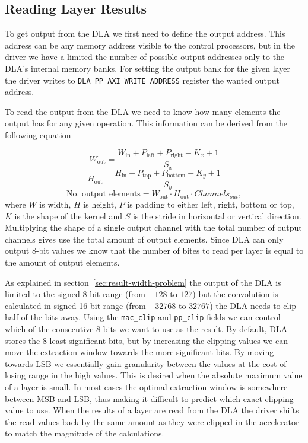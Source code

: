 \documentclass[12pt,a4paper,english
]{tunithesis}
\begin{document}
\subsection{Reading Layer Results}
To get output from the DLA we first need to define the output address. This address can be any memory address visible to the control processors, but in the driver we have a limited the number of possible output addresses only to the DLA's internal memory banks. For setting the output bank for the given layer the driver writes to \texttt{DLA\_PP\_AXI\_WRITE\_ADDRESS} register the wanted output address.

To read the output from the DLA we need to know how many elements the output has for any given operation. This information can be derived from the following equation

\begin{equation}
W_{\text{out}} = \frac{W_{\text{in}} + P_{\text{left}} + P_{\text{right}} - K_x + 1}{S_x}
\end{equation}
\begin{equation}
H_{\text{out}} = \frac{H_{\text{in}} + P_{\text{top}} + P_{\text{bottom}} - K_y + 1}{S_y}
\end{equation}
\begin{equation}
\text{No. output elements} = W_{\text{out}} \cdot H_{\text{out}} \cdot Channels_{out},
\end{equation}
where $W$ is width, $H$ is height, $P$ is padding to either left, right, bottom or top, $K$ is the shape of the kernel and $S$ is the stride in horizontal or vertical direction.
Multiplying the shape of a single output channel with the total number of output channels gives use the total amount of output elements. Since DLA can only output 8-bit values we know that the number of bites to read per layer is equal to the amount of output elements.

As explained in section~\ref{sec:result-width-problem} the output of the DLA is limited to the signed 8 bit range (from $-128$ to $127$) but the convolution is calculated in signed 16-bit range (from $-32768$ to $32767$) the DLA needs to clip half of the bits away. Using the \texttt{mac\_clip} and \texttt{pp\_clip} fields we can control which of the consecutive 8-bits we want to use as the result. By default, DLA stores the 8 least significant bits, but by increasing the clipping values we can move the extraction window towards the more significant bits. By moving towards LSB we essentially gain granularity between the values at the cost of losing range in the high values. This is desired when the absolute maximum value of a layer is small. In most cases the optimal extraction window is somewhere between MSB and LSB, thus making it difficult to predict which exact clipping value to use. When the results of a layer are read from the DLA the driver shifts the read values back by the same amount as they were clipped in the accelerator to match the magnitude of the calculations.
\end{document}
